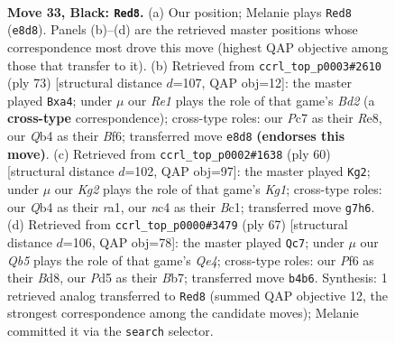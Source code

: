 \documentclass[11pt]{article}
\begin{document}
\clearpage

\begin{figure}[p]\centering
\begin{subfigure}{0.46\textwidth}\centering
\resizebox{\linewidth}{!}{%
\newchessgame
\chessboard[
  setfen={r3r3/1pp3kp/5p2/3p1bb1/1qNK4/N3P3/P4P2/R7 b - - 1 33},
  showmover=false,
  pgfstyle=straightmove, color=movearrow, markmove={e8-d8}
]}
\caption{}
\end{subfigure}\hfill
\begin{subfigure}{0.46\textwidth}\centering
\resizebox{\linewidth}{!}{%
\newchessgame
\chessboard[
  setfen={4r3/3b1pk1/5b2/2rp3R/Pp1N1PP1/3R1K2/P3N3/8 b - - 0 37},
  showmover=false,
  pgfstyle=straightmove, color=movearrow, markmove={d7-a4}
]}
\caption{}
\end{subfigure}
\\[4pt]
\begin{subfigure}{0.46\textwidth}\centering
\resizebox{\linewidth}{!}{%
\newchessgame
\chessboard[
  setfen={4Qnk1/1p1n2p1/2p5/1q6/3pB3/6P1/1P3P1P/r1B1R1K1 w - - 9 31},
  showmover=false,
  pgfstyle=straightmove, color=movearrow, markmove={g1-g2}
]}
\caption{}
\end{subfigure}\hfill
\begin{subfigure}{0.46\textwidth}\centering
\resizebox{\linewidth}{!}{%
\newchessgame
\chessboard[
  setfen={3b1k1r/1b3p2/p6P/4qN1R/3p1N2/1P1P4/8/2Q2K2 b - - 0 34},
  showmover=false,
  pgfstyle=straightmove, color=movearrow, markmove={e5-c7}
]}
\caption{}
\end{subfigure}
\caption{\textbf{Move 33, Black: \texttt{Red8}.} (a) Our position; Melanie plays \texttt{Red8} (\texttt{e8d8}). Panels (b)--(d) are the retrieved master positions whose correspondence most drove this move (highest QAP objective among those that transfer to it). (b) Retrieved from \texttt{ccrl\_top\_p0003\#2610} (ply 73) [structural distance $d$=107, QAP obj=12]: the master played \texttt{Bxa4}; under $\mu$ our \emph{Re1} plays the role of that game's \emph{Bd2} (a \textbf{cross-type} correspondence); cross-type roles: our \emph{P}c7 as their \emph{R}e8, our \emph{Q}b4 as their \emph{B}f6; transferred move \texttt{e8d8} \textbf{(endorses this move)}. (c) Retrieved from \texttt{ccrl\_top\_p0002\#1638} (ply 60) [structural distance $d$=102, QAP obj=97]: the master played \texttt{Kg2}; under $\mu$ our \emph{Kg2} plays the role of that game's \emph{Kg1}; cross-type roles: our \emph{Q}b4 as their \emph{r}a1, our \emph{n}c4 as their \emph{B}c1; transferred move \texttt{g7h6}. (d) Retrieved from \texttt{ccrl\_top\_p0000\#3479} (ply 67) [structural distance $d$=106, QAP obj=78]: the master played \texttt{Qc7}; under $\mu$ our \emph{Qb5} plays the role of that game's \emph{Qe4}; cross-type roles: our \emph{P}f6 as their \emph{B}d8, our \emph{P}d5 as their \emph{B}b7; transferred move \texttt{b4b6}. Synthesis: 1 retrieved analog transferred to \texttt{Red8} (summed QAP objective 12, the strongest correspondence among the candidate moves); Melanie committed it via the \texttt{search} selector.}
\label{fig:thought-m65}
\end{figure}
\end{document}
